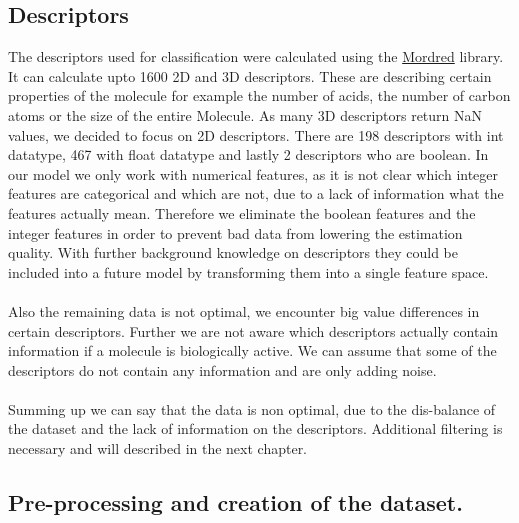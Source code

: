 \documentclass[12pt]{article}
\begin{document}
\subsection{Descriptors}\label{sec:Descriptors}
The descriptors used for classification were calculated using the  \href{https://github.com/mordred-descriptor/mordred}{Mordred} \cite{mordredpaper} library. It can calculate upto 1600 2D and 3D descriptors. These are describing certain properties of the molecule for example the number of acids, the number of carbon atoms or the size of the entire Molecule. As many 3D descriptors return NaN values, we decided to focus on 2D descriptors. There are 198 descriptors with int datatype, 467 with float datatype and lastly 2 descriptors who are boolean. In our model we only work with numerical features, as it is not clear which integer features are categorical and which are not, due to a lack of information what the features actually mean. Therefore we eliminate the boolean features and the integer features in order to prevent bad data from lowering the estimation quality. With further background knowledge on descriptors they could be included into a future model by transforming them into a single feature space.\\\\
%
Also the remaining data is not optimal, we encounter big value differences in certain descriptors. Further we are not aware which descriptors actually contain information if a molecule is biologically active. We can assume that some of the descriptors do not contain any information and are only adding noise.\\\\
%
Summing up we can say that the data is non optimal, due to the dis-balance of the dataset and the lack of information on the descriptors. Additional filtering is necessary and will described in the next chapter.  
\subsection{Pre-processing and creation of the dataset.}
\label{sec:Dataset:pre-processing}
\end{document}
